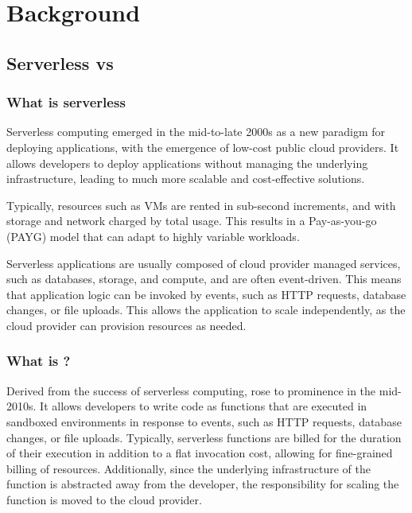 \chapter{Background}

\section{Serverless vs \faas{}}
\subsection{What is serverless}
Serverless computing emerged in the mid-to-late 2000s\cite{wardleyWardleyMaps2022,IntroducingGoogleApp,patilServerlessComputingEmergence2021} as a new paradigm for deploying applications, with the emergence of low-cost public cloud providers\cite{patilServerlessComputingEmergence2021,BenjaminBlackEC2}. It allows developers to deploy applications without managing the underlying infrastructure, leading to much more scalable and cost-effective solutions.

Typically, resources such as VMs\cite{hoeferTaxonomyCloudComputing2010} are rented in sub-second increments, and with storage and network charged by total usage. This results in a Pay-as-you-go (PAYG) model that can adapt to highly variable workloads\cite{sehgalCostBillingPractices2023,hilleyCloudComputingTaxonomy2009}.

Serverless applications are usually composed of cloud provider managed services, such as databases, storage, and compute, and are often event-driven\cite{EventarcOverview,EventListenerAmazon,robeceOverviewAzureEvent2024}. This means that application logic can be invoked by events, such as HTTP requests, database changes, or file uploads. This allows the application to scale independently\cite{goniwadaCloudNativeArchitecture2022}, as the cloud provider can provision resources as needed.

\subsection{What is \faas{}?}
Derived from the success of serverless computing, \faas{} rose to prominence in the mid-2010s\cite{AmazonWebServices2014,azureAnnouncingGeneralAvailability2016}. It allows developers to write code as functions that are executed in sandboxed environments in response to events, such as HTTP requests, database changes, or file uploads\cite{EventarcOverview,EventListenerAmazon,robeceOverviewAzureEvent2024}. Typically, serverless functions are billed for the duration of their execution in addition to a flat invocation cost, allowing for fine-grained billing of resources\cite{bortoliniInvestigatingPerformanceCost2020}. Additionally, since the underlying infrastructure of the function is abstracted away from the developer, the responsibility for scaling the function is moved to the cloud provider.

